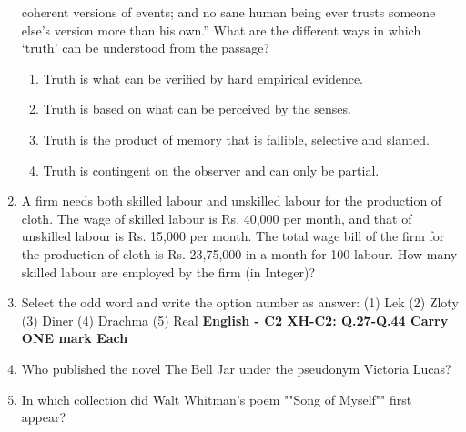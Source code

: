 \documentclass[12pt]{article}
\theoremstyle{remark}
\begin{document}
\begin{enumerate}
coherent versions of events; and no sane human being ever trusts someone else’s
version more than his own.” 
What are the different ways in which ‘truth’ can be understood from the passage? 
\begin{enumerate}
\item Truth is what can be verified by hard empirical evidence. 
\item Truth is based on what can be perceived by the senses. 
\item Truth is the product of memory that is fallible, selective and slanted. 
\item Truth is contingent on the observer and can only be partial. 
\end{enumerate}
\hfill{}
\item A firm needs both skilled labour and unskilled labour for the production of cloth.
The wage of skilled labour is Rs. 40,000 per month, and that of unskilled labour is
Rs. 15,000 per month. The total wage bill of the firm for the production of cloth is
Rs. 23,75,000 in a month for 100 labour. How many skilled labour are employed
by the firm (in Integer)? 
\hfill{}
\item Select the odd word and write the option number as answer: 
(1) Lek (2) Zloty (3) Diner (4) Drachma (5) Real 
\hfill{}
\newpage
\textbf{English - C2 \newline 
XH-C2: Q.27-Q.44 Carry ONE mark Each} 
\item Who published the novel The Bell Jar under the pseudonym Victoria Lucas? 
\begin{enumerate}  \end{enumerate}
\hfill{}
\item In which collection did Walt Whitman's poem ""Song of Myself"" first appear? 
\begin{enumerate} 
\end{enumerate}
\end{enumerate}
\end{document}
